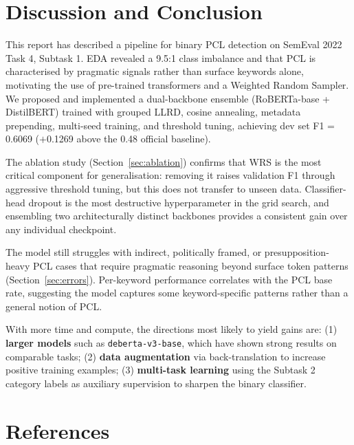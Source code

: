 \documentclass[11pt]{article}
\begin{document}
\section{Discussion and Conclusion}
\label{sec:discussion}

This report has described a pipeline for binary PCL detection on SemEval 2022 Task 4, Subtask 1. EDA revealed a 9.5:1 class imbalance and that PCL is characterised by pragmatic signals rather than surface keywords alone, motivating the use of pre-trained transformers and a Weighted Random Sampler. We proposed and implemented a dual-backbone ensemble (RoBERTa-base + DistilBERT) trained with grouped LLRD, cosine annealing, metadata prepending, multi-seed training, and threshold tuning, achieving dev set F1 = 0.6069 ($+$0.1269 above the 0.48 official baseline).

The ablation study (Section~\ref{sec:ablation}) confirms that WRS is the most critical component for generalisation: removing it raises validation F1 through aggressive threshold tuning, but this does not transfer to unseen data. Classifier-head dropout is the most destructive hyperparameter in the grid search, and ensembling two architecturally distinct backbones provides a consistent gain over any individual checkpoint.

The model still struggles with indirect, politically framed, or presupposition-heavy PCL cases that require pragmatic reasoning beyond surface token patterns (Section~\ref{sec:errors}). Per-keyword performance correlates with the PCL base rate, suggesting the model captures some keyword-specific patterns rather than a general notion of PCL.

With more time and compute, the directions most likely to yield gains are: (1) \textbf{larger models} such as \texttt{deberta-v3-base}, which have shown strong results on comparable tasks; (2) \textbf{data augmentation} via back-translation to increase positive training examples; (3) \textbf{multi-task learning} using the Subtask 2 category labels as auxiliary supervision to sharpen the binary classifier.

\clearpage
\section*{References}
\end{document}
